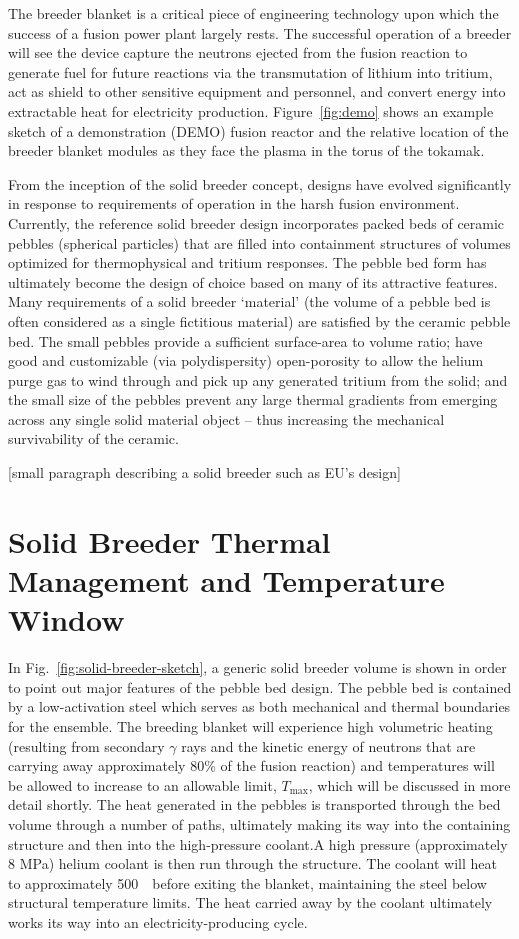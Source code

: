 The breeder blanket is a critical piece of engineering technology upon which the success of a fusion power plant largely rests. The successful operation of a breeder will see the device capture the neutrons ejected from the fusion reaction to generate fuel for future reactions via the transmutation of lithium into tritium, act as shield to other sensitive equipment and personnel, and convert energy into extractable heat for electricity production. Figure~\ref{fig:demo} shows an example sketch of a demonstration (DEMO) fusion reactor and the relative location of the breeder blanket modules as they face the plasma in the torus of the tokamak. 



From the inception of the solid breeder concept, designs have evolved significantly in response to requirements of operation in the harsh fusion environment. Currently, the reference solid breeder design incorporates packed beds of ceramic pebbles (spherical particles) that are filled into containment structures of volumes optimized for thermophysical and tritium responses. The pebble bed form has ultimately become the design of choice based on many of its attractive features. Many requirements of a solid breeder `material' (the volume of a pebble bed is often considered as a single fictitious material) are satisfied by the ceramic pebble bed. The small pebbles provide a sufficient surface-area to volume ratio; have good and customizable (via polydispersity) open-porosity to allow the helium purge gas to wind through and pick up any generated tritium from the solid; and the small size of the pebbles prevent any large thermal gradients from emerging across any single solid material object -- thus increasing the mechanical survivability of the ceramic. 

[small paragraph describing a solid breeder such as EU's design]

\section{Solid Breeder Thermal Management and Temperature Window}
In Fig.~\ref{fig:solid-breeder-sketch}, a generic solid breeder volume is shown in order to point out major features of the pebble bed design. The pebble bed is contained by a low-activation steel which serves as both mechanical and thermal boundaries for the ensemble. The breeding blanket will experience high volumetric heating (resulting from secondary $\gamma$ rays and the kinetic energy of neutrons that are carrying away approximately 80\% of the fusion reaction) and temperatures will be allowed to increase to an allowable limit, $T_\mathrm{max}$, which will be discussed in more detail shortly. The heat generated in the pebbles is transported through the bed volume through a number of paths, ultimately making its way into the containing structure and then into the high-pressure coolant.A high pressure (approximately 8 MPa) helium coolant is then run through the structure. The coolant will heat to approximately 500~\celsius~before exiting the blanket, maintaining the steel below structural temperature limits. The heat carried away by the coolant ultimately works its way into an electricity-producing cycle. 

